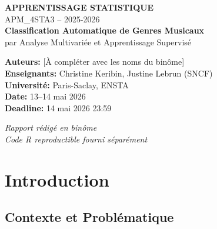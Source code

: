 \documentclass[11pt,a4paper,french]{report}
\begin{document}

\begin{titlepage}
\centering
\vspace*{1cm}

{\Large \textbf{APPRENTISSAGE STATISTIQUE}}\\[0.3cm]
{\large APM\_4STA3 -- 2025-2026}\\[2cm]

{\Huge \textbf{Classification Automatique de Genres Musicaux}}\\[0.5cm]
{\Large par Analyse Multivariée et Apprentissage Supervisé}\\[3cm]

\vfill

\textbf{Auteurs:} [À compléter avec les noms du binôme]\\[0.5cm]
\textbf{Enseignants:} Christine Keribin, Justine Lebrun (SNCF)\\[0.5cm]
\textbf{Université:} Paris-Saclay, ENSTA\\[0.5cm]
\textbf{Date:} 13--14 mai 2026\\[0.5cm]
\textbf{Deadline:} 14 mai 2026 23:59

\vfill

\textit{Rapport rédigé en binôme}\\
\textit{Code R reproductible fourni séparément}

\end{titlepage}


\tableofcontents
\newpage


\chapter*{Introduction}

\section*{Contexte et Problématique}
\end{document}

